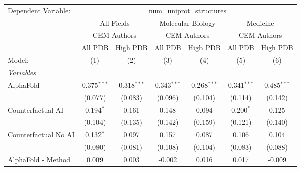 \begingroup
\centering
\begin{tabular}{lcccccc}
   \tabularnewline \midrule \midrule
   Dependent Variable: & \multicolumn{6}{c}{num\_uniprot\_structures}\\
 & \multicolumn{2}{c}{All Fields} & \multicolumn{2}{c}{Molecular Biology} & \multicolumn{2}{c}{Medicine} \\
\cmidrule(lr){2-3} \cmidrule(lr){4-5} \cmidrule(lr){6-7}
 & \multicolumn{2}{c}{CEM Authors} & \multicolumn{2}{c}{CEM Authors} & \multicolumn{2}{c}{CEM Authors} \\
\cmidrule(lr){2-3} \cmidrule(lr){4-5} \cmidrule(lr){6-7}
 & \multicolumn{1}{c}{All PDB} & \multicolumn{1}{c}{High PDB} & \multicolumn{1}{c}{All PDB} & \multicolumn{1}{c}{High PDB} & \multicolumn{1}{c}{All PDB} & \multicolumn{1}{c}{High PDB} \\
\cmidrule(lr){2-2} \cmidrule(lr){3-3} \cmidrule(lr){4-4} \cmidrule(lr){5-5} \cmidrule(lr){6-6} \cmidrule(lr){7-7}
   Model:                                                     & (1)            & (2)           & (3)            & (4)            & (5)           & (6)\\  
   \midrule
   \emph{Variables}\\
   AlphaFold                                                  & 0.375$^{***}$  & 0.318$^{***}$ & 0.343$^{***}$  & 0.268$^{***}$  & 0.341$^{***}$ & 0.485$^{***}$\\   
                                                              & (0.077)        & (0.083)       & (0.096)        & (0.104)        & (0.114)       & (0.142)\\   
   Counterfactual AI                                          & 0.194$^{*}$    & 0.161         & 0.148          & 0.094          & 0.200$^{*}$   & 0.125\\   
                                                              & (0.104)        & (0.135)       & (0.142)        & (0.159)        & (0.121)       & (0.140)\\   
   Counterfactual No AI                                       & 0.132$^{*}$    & 0.097         & 0.157          & 0.087          & 0.106         & 0.104\\   
                                                              & (0.080)        & (0.081)       & (0.108)        & (0.104)        & (0.083)       & (0.088)\\   
   AlphaFold - Method                                         & 0.009          & 0.003         & -0.002         & 0.016          & 0.017         & -0.009\\   

\end{tabular}
